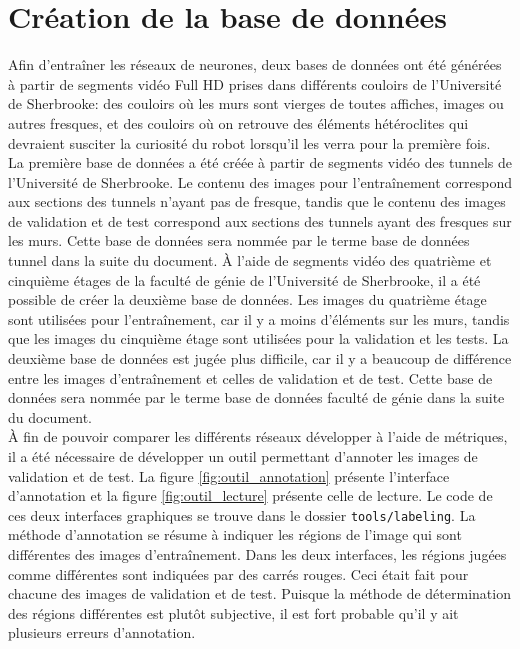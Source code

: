 \section{Création de la base de données}
    Afin d'entraîner les réseaux de neurones, deux bases de données ont été générées à partir de segments vidéo Full HD prises dans différents couloirs de l’Université de Sherbrooke: des couloirs où les murs sont vierges de toutes affiches, images ou autres fresques, et des couloirs où on retrouve des éléments hétéroclites qui devraient susciter la curiosité du robot lorsqu’il les verra pour la première fois.\\
    
    La première base de données a été créée à partir de segments vidéo des tunnels de l'Université de Sherbrooke. Le contenu des images pour l'entraînement correspond aux sections des tunnels n'ayant pas de fresque, tandis que le contenu des images de validation et de test correspond aux sections des tunnels ayant des fresques sur les murs. Cette base de données sera nommée par le terme base de données tunnel dans la suite du document. À l'aide de segments vidéo des quatrième et cinquième étages de la faculté de génie de l'Université de Sherbrooke, il a été possible de créer la deuxième base de données. Les images du quatrième étage sont utilisées pour l'entraînement, car il y a moins d'éléments sur les murs, tandis que les images du cinquième étage sont utilisées pour la validation et les tests. La deuxième base de données est jugée plus difficile, car il y a beaucoup de différence entre les images d'entraînement et celles de validation et de test. Cette base de données sera nommée par le terme base de données faculté de génie dans la suite du document.\\
    
    À fin de pouvoir comparer les différents réseaux développer à l'aide de métriques, il a été nécessaire de développer un outil permettant d'annoter les images de validation et de test. La figure \ref{fig:outil_annotation} présente l'interface d'annotation et la figure \ref{fig:outil_lecture} présente celle de lecture. Le code de ces deux interfaces graphiques se trouve dans le dossier \texttt{tools/labeling}. La méthode d'annotation se résume à indiquer les régions de l'image qui sont différentes des images d'entraînement. Dans les deux interfaces, les régions jugées comme différentes sont indiquées par des carrés rouges. Ceci était fait pour chacune des images de validation et de test. Puisque la méthode de détermination des régions différentes est plutôt subjective, il est fort probable qu'il y ait plusieurs erreurs d'annotation.
    
